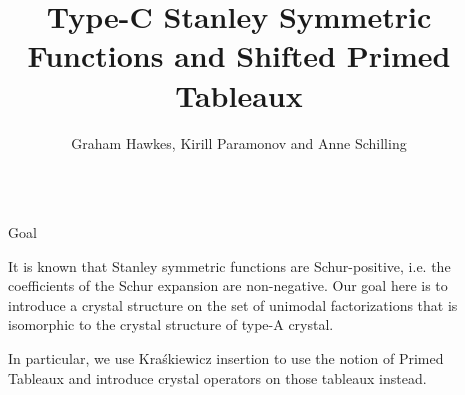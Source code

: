 \documentclass[final]{beamer}
\title{Type-C Stanley Symmetric Functions and Shifted Primed Tableaux} %
\author{Graham Hawkes, Kirill Paramonov and Anne Schilling} %
\institute{University of California, Davis} %
\theoremstyle{definition}
\numberwithin{equation}{section}
\newlength{\sepwid}
\newlength{\onecolwid}
\newlength{\twocolwid}
\begin{document}

\setlength{\belowcaptionskip}{2ex} %
\setlength\belowdisplayshortskip{2ex} %

\begin{frame}[t] %

\begin{columns}[t] %

\begin{column}{\sepwid}\end{column} %

\begin{column}{\twocolwid}\vspace{-.4in} %


\begin{alertblock}{Goal}

It is known that Stanley symmetric functions are Schur-positive, i.e. the coefficients of the Schur expansion are non-negative. 
Our goal here is to introduce a crystal structure on the set of unimodal factorizations that is isomorphic to the crystal structure of type-A crystal.

In particular, we use Kra\'skiewicz insertion to use the notion of Primed Tableaux and introduce crystal operators on those tableaux instead.

\end{alertblock}



\begin{columns}[t]

\begin{column}{\onecolwid}\vspace{-.8in}



\end{column}
\end{columns}
\end{column}
\end{columns}
\end{frame}
\end{document}
